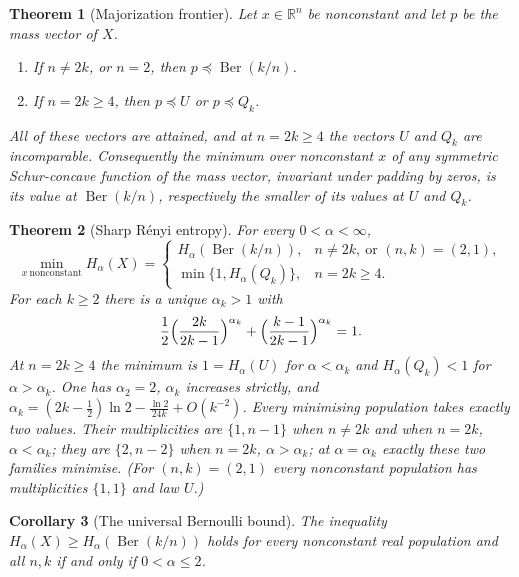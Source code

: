 \documentclass[11pt]{article}
\newtheorem{theorem}{Theorem}[section]
\newtheorem{corollary}[theorem]{Corollary}
\theoremstyle{remark}
\newcommand{\R}{\mathbb R}
\newcommand{\Ber}{\operatorname{Ber}}
\begin{document}
\begin{theorem}[Majorization frontier]\label{thm:frontier}
Let \(x\in\R^n\) be nonconstant and let \(p\) be the mass vector of \(X\).
\begin{enumerate}
\item If \(n\ne2k\), or \(n=2\), then \(p\preceq\Ber(k/n)\).
\item If \(n=2k\ge4\), then \(p\preceq U\) or \(p\preceq Q_k\).
\end{enumerate}
All of these vectors are attained, and at \(n=2k\ge4\) the vectors \(U\) and
\(Q_k\) are incomparable. Consequently the minimum over nonconstant \(x\) of any
symmetric Schur-concave function of the mass vector, invariant under padding
by zeros, is its value at \(\Ber(k/n)\), respectively the smaller of its
values at \(U\) and \(Q_k\).
\end{theorem}

\begin{theorem}[Sharp R\'enyi entropy]\label{thm:entropy}
For every \(0<\alpha<\infty\),
\[
 \min_{x\ \text{nonconstant}} H_\alpha(X)=
 \begin{cases}
 H_\alpha(\Ber(k/n)),& n\ne2k,\ \text{or }(n,k)=(2,1),\\
 \min\{1,H_\alpha(Q_k)\},& n=2k\ge4.
 \end{cases}
\]
For each \(k\ge2\) there is a unique \(\alpha_k>1\) with
\begin{equation}\label{eq:transition}
 \frac12\Bigl(\frac{2k}{2k-1}\Bigr)^{\alpha_k}
 +\Bigl(\frac{k-1}{2k-1}\Bigr)^{\alpha_k}=1 .
\end{equation}
At \(n=2k\ge4\) the minimum is \(1=H_\alpha(U)\) for \(\alpha<\alpha_k\) and
\(H_\alpha(Q_k)<1\) for \(\alpha>\alpha_k\). One has \(\alpha_2=2\),
\(\alpha_k\) increases strictly, and
\(\alpha_k=(2k-\tfrac12)\ln2-\tfrac{\ln2}{24k}+O(k^{-2})\).
Every minimising population takes exactly two values. Their multiplicities
are \(\{1,n-1\}\) when \(n\ne2k\) and when \(n=2k\), \(\alpha<\alpha_k\);
they are \(\{2,n-2\}\) when \(n=2k\), \(\alpha>\alpha_k\); at
\(\alpha=\alpha_k\) exactly these two families minimise. (For \((n,k)=(2,1)\)
every nonconstant population has multiplicities \(\{1,1\}\) and law \(U\).)
\end{theorem}

\begin{corollary}[The universal Bernoulli bound]\label{cor:universal}
The inequality \(H_\alpha(X)\ge H_\alpha(\Ber(k/n))\) holds for every
nonconstant real population and all \(n,k\) if and only if \(0<\alpha\le2\).
\end{corollary}
\end{document}
